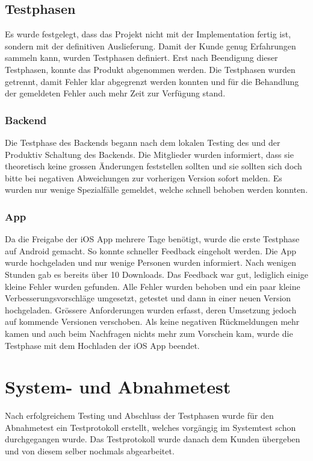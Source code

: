\subsection{Testphasen}
Es wurde festgelegt, dass das Projekt nicht mit der Implementation fertig ist, sondern mit der definitiven Auslieferung. Damit der Kunde genug Erfahrungen sammeln kann, wurden Testphasen definiert. Erst nach Beendigung dieser Testphasen, konnte das Produkt abgenommen werden. Die Testphasen wurden getrennt, damit Fehler klar abgegrenzt werden konnten und für die Behandlung der gemeldeten Fehler auch mehr Zeit zur Verfügung stand.

\subsubsection{Backend}
Die Testphase des Backends begann nach dem lokalen Testing des  und der Produktiv Schaltung des Backends. Die Mitglieder wurden informiert, dass sie theoretisch keine grossen Änderungen feststellen sollten und sie sollten sich doch bitte bei negativen Abweichungen zur vorherigen Version sofort melden. Es wurden nur wenige Spezialfälle gemeldet, welche schnell behoben werden konnten.

\subsubsection{App}
Da die Freigabe der iOS App mehrere Tage benötigt, wurde die erste Testphase auf Android gemacht. So konnte schneller Feedback eingeholt werden. Die App wurde hochgeladen und nur wenige Personen wurden informiert. Nach wenigen Stunden gab es bereits über 10 Downloads. Das Feedback war gut, lediglich einige kleine Fehler wurden gefunden. Alle Fehler wurden behoben und ein paar kleine Verbesserungsvorschläge umgesetzt, getestet und dann in einer neuen Version hochgeladen. Grössere Anforderungen wurden erfasst, deren Umsetzung jedoch auf kommende Versionen verschoben. Als keine negativen Rückmeldungen mehr kamen und auch beim Nachfragen nichts mehr zum Vorschein kam, wurde die Testphase mit dem Hochladen der iOS App beendet.

\section{System- und Abnahmetest}
Nach erfolgreichem Testing und Abschluss der Testphasen wurde für den Abnahmetest ein Testprotokoll erstellt, welches vorgängig im Systemtest schon durchgegangen wurde. Das Testprotokoll wurde danach dem Kunden übergeben und von diesem selber nochmals abgearbeitet.

